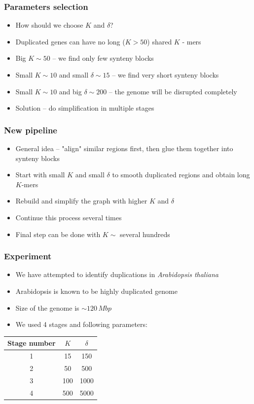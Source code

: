\documentclass[svgnames,14pt]{beamer}
\begin{document}
\begin{frame}
\frametitle{Parameters selection}
\begin{itemize}
\item How should we choose \(K\) and \(\delta\)?
\item Duplicated genes can have no long (\(K > 50 \)) shared \(K\) - mers
\item Big \(K \sim 50\) -- we find only few synteny blocks
\item Small \(K \sim 10\) and small \(\delta \sim 15\) -- we find very short synteny blocks
\item Small \(K \sim 10\) and big \(\delta \sim 200 \) -- the genome will be disrupted completely
\pause \item Solution -- do simplification in multiple stages 
\end{itemize}
\end{frame}

\begin{frame}
\frametitle{New pipeline}
\begin{itemize}
\item General idea -- "align" similar regions first, then glue them together into synteny blocks
\item Start with small \(K\) and small \(\delta\) to smooth duplicated regions and obtain long \(K\)-mers
\item Rebuild and simplify the graph with higher \(K\) and \(\delta\)
\item Continue this process several times
\item Final step can be done with \(K \sim \) several hundreds
\end{itemize}
\end{frame}

\begin{frame}
\frametitle{Experiment}
\begin{itemize}
\item We have attempted to identify duplications in \emph{Arabidopsis thaliana}
\item Arabidopsis is known to be highly duplicated genome 
\item Size of the genome is \( \sim 120 \, Mbp \)
\item We used 4 stages and following parameters:
\end{itemize}
\begin{center}
\begin{tabular}{|c|c|c|}
\hline
Stage number & \(K\) & \(\delta\) \\
\hline
1 & 15 & 150 \\
\hline
2 & 50 & 500\\
\hline
3 & 100 & 1000\\
\hline
4 & 500 & 5000\\
\hline
\end{tabular}
\end{center}
\end{frame}
\end{document}
